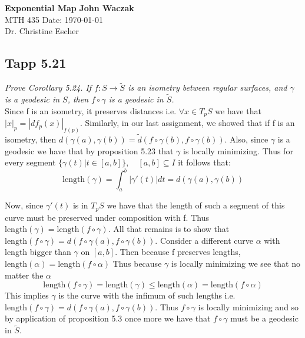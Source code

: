 \documentclass[a4paper, 11pt]{article}
\begin{document}
\noindent
\large\textbf{Exponential Map} \hfill \textbf{John Waczak} \\
\normalsize MTH 435 \hfill  Date: \today \\
Dr. Christine Escher \\

\subsection*{Tapp 5.21} 
	\textit{Prove Corollary 5.24. If $f:S\rightarrow \tilde{S}$ is an isometry between regular surfaces, and $\gamma$ is a geodesic in $S$, then $f\circ\gamma$ is a geodesic in $\tilde{S}$.} \\ 
	
	\noindent Since f is an isometry, it preserves distances i.e. $\forall x \in T_pS$ we have that $|x|_p = |df_p(x)|_{f(p)}$. Similarly, in our last assignment, we showed that if f is an isometry, then $d(\gamma(a), \gamma(b))=\tilde{d}(f\circ\gamma(b), f\circ\gamma(b))$.  Also, since $\gamma$ is a geodesic we have that by proposition 5.23 that $\gamma$ is locally minimizing. Thus for every segment $\{\gamma(t)|t\in[a,b]\}, \quad [a,b] \subseteq I$ it follows that:
		\begin{equation*}
			\text{length}(\gamma) = \int_a^b |\gamma'(t)|dt = d(\gamma(a), \gamma(b))
		\end{equation*}
		
	\noindent Now, since $\gamma'(t)$ is in $T_pS$ we have that the length of such a segment of this curve must be preserved under composition with f. Thus $\text{length}(\gamma)=\text{length}(f\circ\gamma)$. All that remains is to show that $\text{length}(f\circ\gamma)=d(f\circ\gamma(a), f\circ\gamma(b))$. Consider a different curve $\alpha$ with length bigger than $\gamma$ on $[a,b]$. Then because f preserves lengths, $\text{length}(\alpha)=\text{length}(f\circ\alpha)$ Thus because $\gamma$ is locally minimizing we see that no matter the $\alpha$ 					
		\begin{equation*}
			\text{length}(f\circ\gamma) =  \text{length}(\gamma) \leq \text{length}(\alpha) = \text{length}(f\circ\alpha)
		\end{equation*}
	This implies $\gamma$ is the curve with the infimum of such lengths i.e. $\text{length}(f\circ\gamma) = d(f\circ\gamma(a), f\circ\gamma(b))	$. Thus $f\circ\gamma$ is locally minimizing and so by application of proposition 5.3 once more we have that $f\circ\gamma$ must be a geodesic in $\tilde{S}$. \\
	
\end{document}

